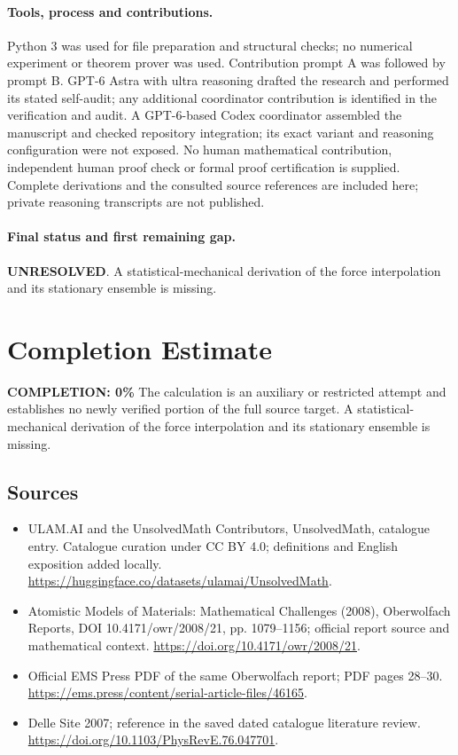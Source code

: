 \documentclass[11pt]{article}
\begin{document}
\paragraph{Tools, process and contributions.}
Python 3 was used for file preparation and structural checks; no numerical experiment or theorem prover was used. Contribution prompt A was followed by prompt B. GPT-6 Astra with ultra reasoning drafted the research and performed its stated self-audit; any additional coordinator contribution is identified in the verification and audit. A GPT-6-based Codex coordinator assembled the manuscript and checked repository integration; its exact variant and reasoning configuration were not exposed. No human mathematical contribution, independent human proof check or formal proof certification is supplied. Complete derivations and the consulted source references are included here; private reasoning transcripts are not published.

\paragraph{Final status and first remaining gap.}
\textbf{UNRESOLVED}. A statistical-mechanical derivation of the force interpolation and its stationary ensemble is missing.

\section{Completion Estimate}
\noindent\textbf{COMPLETION: 0\%}
The calculation is an auxiliary or restricted attempt and establishes no newly verified portion of the full source target. A statistical-mechanical derivation of the force interpolation and its stationary ensemble is missing.

\subsection{Sources}
\begin{itemize}
\item[\hypertarget{source:statement:1}{S1}] ULAM.AI and the UnsolvedMath Contributors, UnsolvedMath, catalogue entry. Catalogue curation under CC BY 4.0; definitions and English exposition added locally.
\url{https://huggingface.co/datasets/ulamai/UnsolvedMath}.
\item[\hypertarget{source:statement:2}{S2}] Atomistic Models of Materials: Mathematical Challenges (2008), Oberwolfach Reports, DOI 10.4171/owr/2008/21, pp. 1079--1156; official report source and mathematical context.
\url{https://doi.org/10.4171/owr/2008/21}.
\item[\hypertarget{source:statement:3}{S3}] Official EMS Press PDF of the same Oberwolfach report; PDF pages 28--30.
\url{https://ems.press/content/serial-article-files/46165}.
\item[\hypertarget{source:statement:4}{S4}] Delle Site 2007; reference in the saved dated catalogue literature review.
\url{https://doi.org/10.1103/PhysRevE.76.047701}.
\end{itemize}
\label{end:statement}
\end{document}
